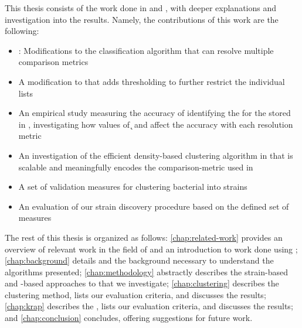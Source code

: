 
This thesis consists of the work done in \cite{DBLP:conf/bibm/McGovernDKBVG15} and \cite{DBLP:conf/bcb/McGovernJDBKV16}, with deeper explanations and investigation into the results.
Namely, the contributions of this work are the following:
\begin{itemize}
    \item \krapmed{}: Modifications to the \kNN{} classification algorithm that can resolve multiple comparison metrics
    \item A modification to \kNN{} that adds \a{} thresholding to further restrict the individual \kNN{} lists
    \item An empirical study measuring the accuracy of identifying the \spec{} for the \ecoli{} \isols{} stored in \cplop{}, investigating how values of \k{} and \a{} affect the accuracy with each resolution metric
    \item An investigation of the efficient density-based clustering algorithm in \cite{johnson2015density} that is scalable and meaningfully encodes the comparison-metric used in \cplop{}
    \item A set of validation measures for clustering bacterial \isols{} into strains
    \item An evaluation of our strain discovery procedure based on the defined set of measures
\end{itemize}

The rest of this thesis is organized as follows:
\autoref{chap:related-work} provides an overview of relevant work in the field of \mst{} and an introduction to work done using \cplop{};
\autoref{chap:background} details \cplop{} and the background necessary to understand the algorithms presented;
\autoref{chap:methodology} abstractly describes the strain-based and \isol{}-based approaches to \mst{} that we investigate;
\autoref{chap:clustering} describes the \dbscan{} clustering method, lists our evaluation criteria, and discusses the results;
\autoref{chap:krap} describes the \kraplong{}, lists our evaluation criteria, and discusses the results;
and
\autoref{chap:conclusion} concludes, offering suggestions for future work.